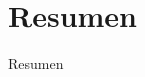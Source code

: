 \documentclass[
	12pt, %
	aspectratio=169, %
]{beamer}
\begin{document}


\section{Resumen}

\begin{frame}{Resumen}%



\end{frame}
\end{document}
